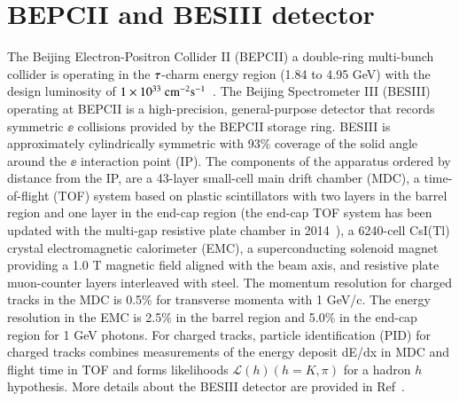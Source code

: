 \section{BEPCII and BESIII detector}
\label{sec:detector}
The Beijing Electron-Positron Collider II (BEPCII) \textemdash a double-ring multi-bunch collider \textemdash is operating in the \(\rm \tau\)-charm energy region (1.84 to 4.95 GeV) with the design luminosity of \(\rm 1\times10^{33}~cm^{-2}s^{-1}\)~\cite{whitePaper}. The Beijing Spectrometer III (BESIII) operating at BEPCII is a high-precision, general-purpose detector that records symmetric $\ee$ collisions provided by the BEPCII storage ring. BESIII is approximately cylindrically symmetric with 93\% coverage of the solid angle around the $\ee$ interaction point (IP). The components of the apparatus ordered by distance from the IP, are a 43-layer small-cell main drift chamber (MDC), a time-of-flight (TOF) system based on plastic scintillators with two layers in the barrel region and one layer in the end-cap region (the end-cap TOF system has been updated with the multi-gap resistive plate chamber in 2014~\cite{Yang2014}), a 6240-cell CsI(Tl) crystal electromagnetic calorimeter (EMC), a superconducting solenoid magnet providing a 1.0 T magnetic field aligned with the beam axis, and resistive plate muon-counter layers interleaved with steel. The momentum resolution for charged tracks in the MDC is 0.5\% for transverse momenta with 1 GeV/c. The energy resolution in the EMC is 2.5\% in the barrel region and 5.0\% in the end-cap region for 1 GeV photons. For charged tracks, particle identification (PID) for charged tracks combines measurements of the energy deposit dE/dx in MDC and flight time in TOF and forms likelihoods $\mathcal{L}(h)(h=K, \pi)$ for a hadron $h$ hypothesis. More details about the BESIII detector are provided in Ref~\cite{BESIII_detector}.
 